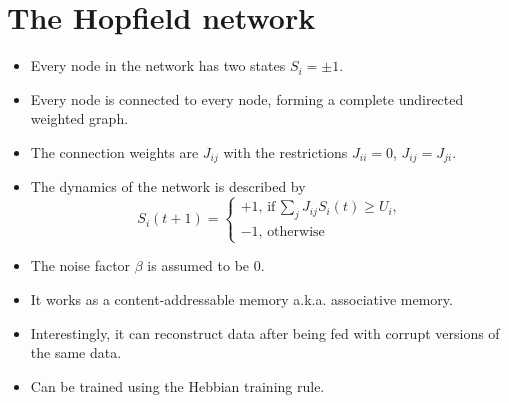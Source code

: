 \documentclass[12pt]{article}
\numberwithin{equation}{section}
\begin{document}
\section*{The Hopfield network}
\begin{minipage}[c]{0.45\textwidth}
    \begin{itemize}
        \item Every node in the network has two states $S_i = \pm 1$.
        \item Every node is connected to every node, forming a complete 
        undirected weighted graph.
        \item The connection weights are $J_{ij}$ with the restrictions
        $J_{ii}=0$, $J_{ij} = J_{ji}$. 
        \item The dynamics of the network is described by
        \begin{equation*}
            S_i(t+1) = \begin{cases}
                +1,\,\textrm{if}\,\sum\limits_jJ_{ij}S_i(t) \geq U_i,\\
                -1,\,\textrm{otherwise}
            \end{cases}
        \end{equation*}
        \item The noise factor $\beta$ is assumed to be $0$.
        \item It works as a content-addressable memory a.k.a. associative memory.
        \item Interestingly, it can reconstruct data after being fed with corrupt versions of the same data.
        \item Can be trained using the Hebbian training rule.
    \end{itemize}
\end{minipage}
\hfill
\end{document}
